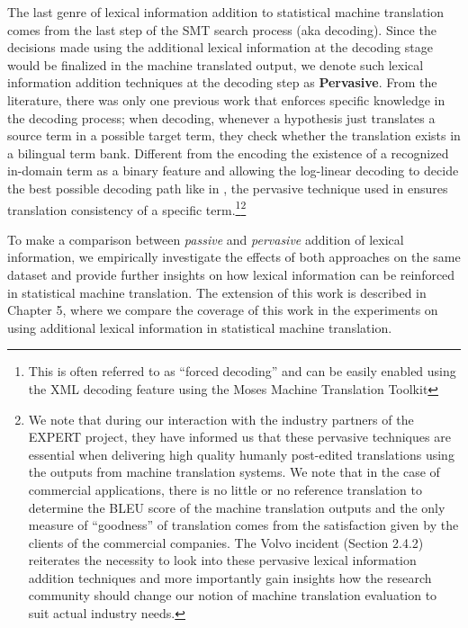 The last genre of lexical information addition to statistical machine translation comes from the last step of the SMT search process (aka decoding). Since the decisions made using the additional lexical information at the decoding stage would be finalized in the machine translated output, we denote such lexical information addition techniques at the decoding step as \textbf{Pervasive}. From the literature, there was only one previous work that enforces specific knowledge in the decoding process; when decoding, \cite{meng2014} whenever a hypothesis just translates a source term in a possible target term, they check whether the translation exists in a bilingual term bank. Different from the encoding the existence of a recognized in-domain term as a binary feature and allowing the log-linear decoding to decide the best possible decoding path like in \cite{skadicnvs2013application}, the pervasive technique used in \cite{meng2014} ensures translation consistency of a specific term.\footnote{This is often referred to as ``forced decoding'' and can be easily enabled using the XML decoding feature using the Moses Machine Translation Toolkit}\footnote{We note that during our interaction with the industry partners of the EXPERT project, they have informed us that these pervasive techniques are essential when delivering high quality humanly post-edited translations using the outputs from machine translation systems. We note that in the case of commercial applications, there is no little or no reference translation to determine the BLEU score of the machine translation outputs and the only measure of ``goodness'' of translation comes from the satisfaction given by the clients of the commercial companies. The Volvo incident (Section 2.4.2) reiterates the necessity to  look into these pervasive lexical information addition techniques and more importantly gain insights how the research community should change our notion of machine translation evaluation to suit actual industry needs.}

To make a comparison between \textit{passive} and \textit{pervasive} addition of lexical information, %
we empirically investigate the effects of both approaches on the same dataset and provide further insights on how lexical information can be reinforced in statistical machine translation. The extension of this work is described in Chapter 5, where we compare the coverage of this work in the experiments on using additional lexical information in statistical machine translation.


